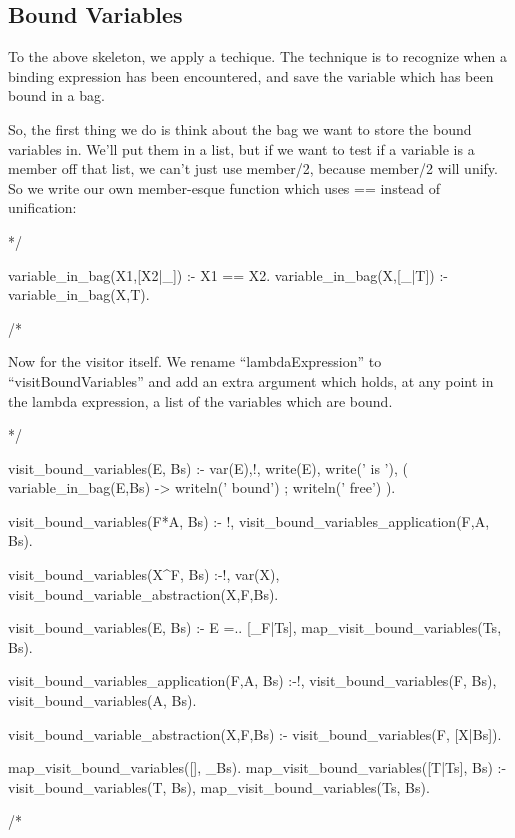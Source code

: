 \documentclass{book}[9pt]
\newenvironment{code}%
{\small \verbatim}%
{\endverbatim \large}
\begin{document}
\subsection{Bound Variables}

To the above skeleton, we apply a techique.  The technique is to
recognize when a binding expression has been encountered, and save the
variable which has been bound in a bag.

So, the first thing we do is think about the bag we want to store the
bound variables in.  We'll put them in a list, but if we want to test
if a variable is a member off that list, we can't just use member/2,
because member/2 will unify.  So we write our own member-esque
function which uses == instead of unification:

\begin{code}
*/

variable_in_bag(X1,[X2|_]) :- X1 == X2.
variable_in_bag(X,[_|T]) :- variable_in_bag(X,T).

/*
\end{code}

Now for the visitor itself.  We rename ``lambdaExpression'' to
``visitBoundVariables'' and add an extra argument which holds, at any
point in the lambda expression, a list of the variables which are
bound.

\begin{code}
*/

visit_bound_variables(E, Bs) :- var(E),!,
        write(E), write(' is '),
        ( variable_in_bag(E,Bs) ->
            writeln(' bound')
        ;
            writeln(' free')
        ).

visit_bound_variables(F*A, Bs) :- !,
        visit_bound_variables_application(F,A, Bs).

visit_bound_variables(X^F, Bs) :-!,
        var(X),
        visit_bound_variable_abstraction(X,F,Bs).

visit_bound_variables(E, Bs) :-
        E =.. [_F|Ts],
        map_visit_bound_variables(Ts, Bs).

visit_bound_variables_application(F,A, Bs) :-!,
        visit_bound_variables(F, Bs),
        visit_bound_variables(A, Bs).

visit_bound_variable_abstraction(X,F,Bs) :-
        visit_bound_variables(F, [X|Bs]).

map_visit_bound_variables([], _Bs).
map_visit_bound_variables([T|Ts], Bs) :-
        visit_bound_variables(T, Bs),
        map_visit_bound_variables(Ts, Bs).

/*
\end{code}
\end{document}
